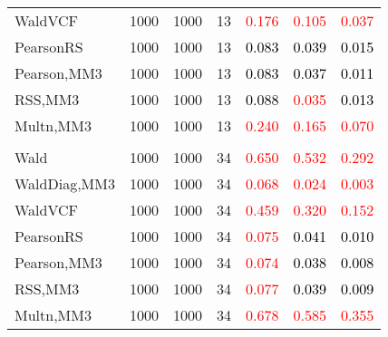 \documentclass[
]{article}
\begin{document}
\begin{table}[H]
{\begin{tabular}[t]{lrrrrrr}
\hspace{1em}WaldVCF & 1000 & 1000 & 13 & \textcolor{red}{0.176} & \textcolor{red}{0.105} & \textcolor{red}{0.037}\\
\hspace{1em}PearsonRS & 1000 & 1000 & 13 & \textcolor{black}{0.083} & \textcolor{black}{0.039} & \textcolor{black}{0.015}\\
\hspace{1em}Pearson,MM3 & 1000 & 1000 & 13 & \textcolor{black}{0.083} & \textcolor{black}{0.037} & \textcolor{black}{0.011}\\
\hspace{1em}RSS,MM3 & 1000 & 1000 & 13 & \textcolor{black}{0.088} & \textcolor{red}{0.035} & \textcolor{black}{0.013}\\
\hspace{1em}Multn,MM3 & 1000 & 1000 & 13 & \textcolor{red}{0.240} & \textcolor{red}{0.165} & \textcolor{red}{0.070}\\
\addlinespace[0.3em]
\multicolumn{7}{l}{\textbf{3F 15V}}\\
\hspace{1em}Wald & 1000 & 1000 & 34 & \textcolor{red}{0.650} & \textcolor{red}{0.532} & \textcolor{red}{0.292}\\
\hspace{1em}WaldDiag,MM3 & 1000 & 1000 & 34 & \textcolor{red}{0.068} & \textcolor{red}{0.024} & \textcolor{red}{0.003}\\
\hspace{1em}WaldVCF & 1000 & 1000 & 34 & \textcolor{red}{0.459} & \textcolor{red}{0.320} & \textcolor{red}{0.152}\\
\hspace{1em}PearsonRS & 1000 & 1000 & 34 & \textcolor{red}{0.075} & \textcolor{black}{0.041} & \textcolor{black}{0.010}\\
\hspace{1em}Pearson,MM3 & 1000 & 1000 & 34 & \textcolor{red}{0.074} & \textcolor{black}{0.038} & \textcolor{black}{0.008}\\
\hspace{1em}RSS,MM3 & 1000 & 1000 & 34 & \textcolor{red}{0.077} & \textcolor{black}{0.039} & \textcolor{black}{0.009}\\
\hspace{1em}Multn,MM3 & 1000 & 1000 & 34 & \textcolor{red}{0.678} & \textcolor{red}{0.585} & \textcolor{red}{0.355}\\
\bottomrule
\end{tabular}}
\endgroup{}
\end{table}
\end{document}
